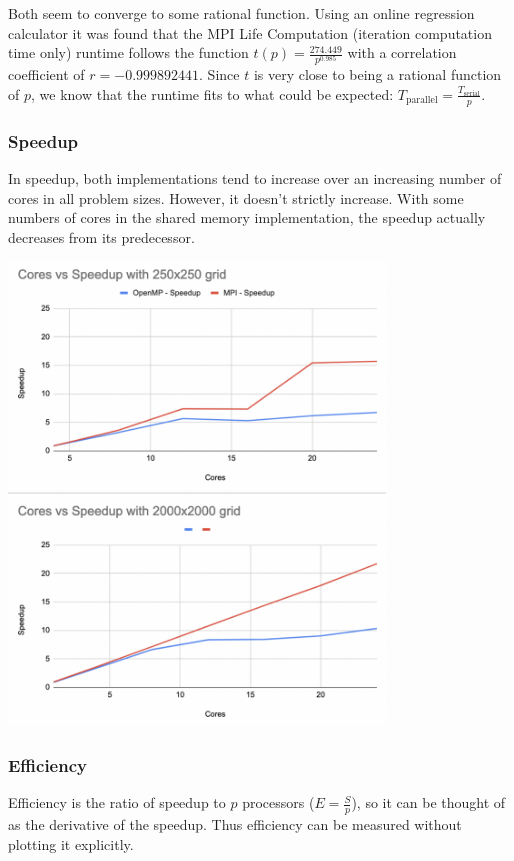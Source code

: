 \documentclass[11pt]{article}
\begin{document}
Both seem to converge to some rational function. Using an online regression calculator it was found that the MPI Life Computation (iteration computation time only) runtime follows the function \(t(p)=\frac{274.449}{p^{0.985}}\) with a correlation coefficient of \(r=-0.999892441\). Since \(t\) is very close to being a rational function of \(p\), we know that the runtime fits to what could be expected: \(T_{\text{parallel}} = \frac{T_{\text{serial}}}{p}\).

\subsubsection{Speedup}
\label{sec:org3812f4f}
In speedup, both implementations tend to increase over an increasing number of cores in all problem sizes. However, it doesn't strictly increase. With some numbers of cores in the shared memory implementation, the speedup actually decreases from its predecessor. 

\begin{center}
\includegraphics[width=10cm]{./speedups-vs-cores.png}
\end{center}


\subsubsection{Efficiency}
\label{sec:org477fbb5}
Efficiency is the ratio of speedup to \(p\) processors (\(E = \frac{S}{p}\)), so it can be thought of as the derivative of the speedup. Thus efficiency can be measured without plotting it explicitly.
\end{document}
